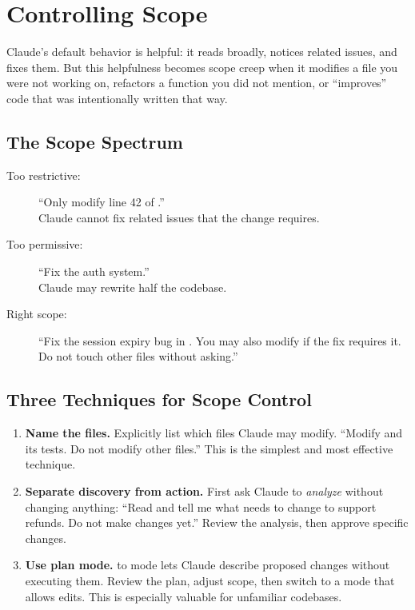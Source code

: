 \section{Controlling Scope}
\label{sec:scope-control}


Claude's default behavior is helpful: it reads broadly, notices
related issues, and fixes them. But this helpfulness becomes scope
creep when it modifies a file you were not working on, refactors
a function you did not mention, or ``improves'' code that was
intentionally written that way.

\subsection*{The Scope Spectrum}

\begin{description}
  \item[Too restrictive:] ``Only modify line 42 of .''\\
    Claude cannot fix related issues that the change requires.
  \item[Too permissive:] ``Fix the auth system.''\\
    Claude may rewrite half the codebase.
  \item[Right scope:] ``Fix the session expiry bug in
    . You may also modify
     if the fix requires it.
    Do not touch other files without asking.''
\end{description}

\subsection*{Three Techniques for Scope Control}

\begin{enumerate}
  \item \textbf{Name the files.} Explicitly list which files Claude
    may modify. ``Modify  and its tests.
    Do not modify other files.'' This is the simplest and most
    effective technique.

  \item \textbf{Separate discovery from action.} First ask Claude to
    \emph{analyze} without changing anything: ``Read
     and tell me what needs to change to support
    refunds. Do not make changes yet.'' Review the analysis, then
    approve specific changes.

  \item \textbf{Use plan mode.}  to  mode
    lets Claude describe proposed changes without executing them.
    Review the plan, adjust scope, then switch to a mode that allows
    edits. This is especially valuable for unfamiliar codebases.
\end{enumerate}


